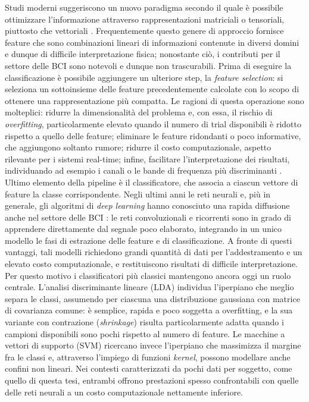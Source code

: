 Studi moderni suggeriscono un nuovo paradigma secondo il quale è possibile ottimizzare l’informazione attraverso rappresentazioni matriciali o tensoriali, piuttosto che vettoriali \cite{lotte2018review}. Frequentemente questo genere di approccio fornisce feature che sono combinazioni lineari di informazioni contenute in diversi domini e dunque di difficile interpretazione fisica; nonostante ciò, i contributi per il settore delle BCI sono notevoli e dunque non trascurabili.
Prima di eseguire la classificazione è possibile aggiungere un ulteriore step, la \emph{feature selection}: si seleziona un sottoinsieme delle feature precedentemente calcolate con lo scopo di ottenere una rappresentazione più compatta. Le ragioni di questa operazione sono molteplici: ridurre la dimensionalità del problema e, con essa, il rischio di \emph{overfitting}, particolarmente elevato quando il numero di trial disponibili è ridotto rispetto a quello delle feature; eliminare le feature ridondanti o poco informative, che aggiungono soltanto rumore; ridurre il costo computazionale, aspetto rilevante per i sistemi real-time; infine, facilitare l’interpretazione dei risultati, individuando ad esempio i canali o le bande di frequenza più discriminanti \cite{lotte2007review}.
Ultimo elemento della pipeline è il classificatore, che associa a ciascun vettore di feature la classe corrispondente. Negli ultimi anni le reti neurali e, più in generale, gli algoritmi di \emph{deep learning} hanno conosciuto una rapida diffusione anche nel settore delle BCI \cite{hossain2022status}: le reti convoluzionali e ricorrenti sono in grado di apprendere direttamente dal segnale poco elaborato, integrando in un unico modello le fasi di estrazione delle feature e di classificazione. A fronte di questi vantaggi, tali modelli richiedono grandi quantità di dati per l’addestramento e un elevato costo computazionale, e restituiscono risultati di difficile interpretazione. Per questo motivo i classificatori più classici mantengono ancora oggi un ruolo centrale. L’analisi discriminante lineare (LDA) individua l’iperpiano che meglio separa le classi, assumendo per ciascuna una distribuzione gaussiana con matrice di covarianza comune: è semplice, rapida e poco soggetta a overfitting, e la sua variante con contrazione (\emph{shrinkage}) risulta particolarmente adatta quando i campioni disponibili sono pochi rispetto al numero di feature. Le macchine a vettori di supporto (SVM) ricercano invece l’iperpiano che massimizza il margine fra le classi e, attraverso l’impiego di funzioni \emph{kernel}, possono modellare anche confini non lineari. Nei contesti caratterizzati da pochi dati per soggetto, come quello di questa tesi, entrambi offrono prestazioni spesso confrontabili con quelle delle reti neurali a un costo computazionale nettamente inferiore.
